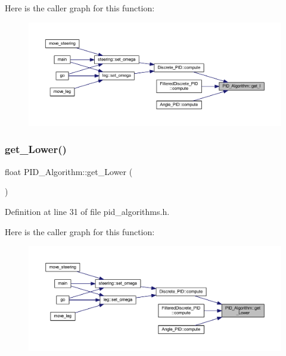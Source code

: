 Here is the caller graph for this function\+:
\nopagebreak
\begin{figure}[H]
\begin{center}
\leavevmode
\includegraphics[width=350pt]{class_p_i_d___algorithm_a6305260cd346415953b41fb765d33740_icgraph}
\end{center}
\end{figure}
\mbox{\label{class_p_i_d___algorithm_a2029e728fcc641ba204b44ef2c6dd2d9}} 
\subsubsection{\texorpdfstring{get\_Lower()}{get\_Lower()}}
{\footnotesize\ttfamily float P\+I\+D\+\_\+\+Algorithm\+::get\+\_\+\+Lower (\begin{DoxyParamCaption}{ }\end{DoxyParamCaption})\hspace{0.3cm}{\ttfamily [inline]}}



Definition at line 31 of file pid\+\_\+algorithms.\+h.

Here is the caller graph for this function\+:
\nopagebreak
\begin{figure}[H]
\begin{center}
\leavevmode
\includegraphics[width=350pt]{class_p_i_d___algorithm_a2029e728fcc641ba204b44ef2c6dd2d9_icgraph}
\end{center}
\end{figure}
\mbox{\label{class_p_i_d___algorithm_a0dd1059744956de2a09c72bd607ee2f4}} 
